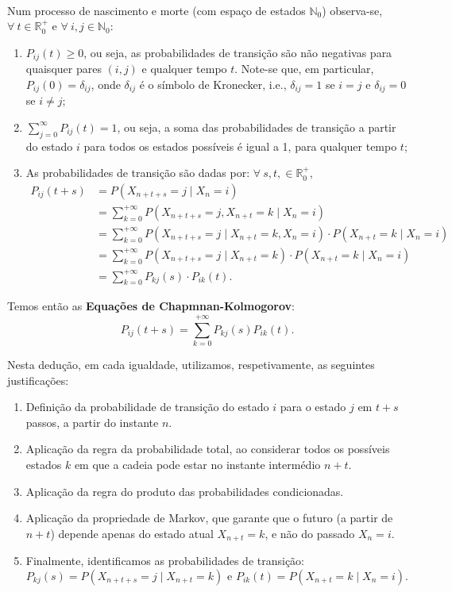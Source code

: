 \documentclass[
  11pt,
  a4paper,
]{book}
\theoremstyle{definition}
\theoremstyle{definition}
\theoremstyle{definition}
\theoremstyle{definition}
\theoremstyle{remark}
\begin{document}
\(\,\)

Num processo de nascimento e morte (com espaço de estados \(\mathbb{N}_0\)) observa-se, \(\forall ~t\in\mathbb{R}_0^+\) e \(\forall ~ i,j\in\mathbb{N}_0\):

\begin{enumerate}
\def\labelenumi{\arabic{enumi}.}
\item
  \(P_{ij}(t) \geq 0\), ou seja, as probabilidades de transição são não negativas para quaisquer pares \((i,j)\) e qualquer tempo \(t\). Note-se que, em particular, \(P_{ij}(0)=\delta_{ij}\), onde \(\delta_{ij}\) é o símbolo de Kronecker, i.e., \(\delta_{ij}=1\) se \(i=j\) e \(\delta_{ij}=0\) se \(i \neq j\);
\item
  \(\displaystyle \sum_{j=0}^{\infty} P_{ij}(t)=1\), ou seja, a soma das probabilidades de transição a partir do estado \(i\) para todos os estados possíveis é igual a 1, para qualquer tempo \(t\);
\item
  As probabilidades de transição são dadas por: \(\forall ~s,t, \in \mathbb{R}_0^+\),
  \begin{align*}
  P_{ij}(t+s) &= P(X_{n+t+s}=j \mid X_n=i)  \\
           &= \sum\limits_{k=0}^{+\infty} P(X_{n+t+s}=j, X_{n+t}=k \mid X_n=i) \\
           &= \sum\limits_{k=0}^{+\infty} P(X_{n+t+s}=j \mid X_{n+t}=k, X_n=i) \cdot P(X_{n+t}=k \mid X_n=i) \\
           &= \sum\limits_{k=0}^{+\infty} P(X_{n+t+s}=j \mid X_{n+t}=k) \cdot P(X_{n+t}=k \mid X_n=i) \\
           &= \sum\limits_{k=0}^{+\infty} P_{kj}(s) \cdot P_{ik}(t).
  \end{align*}
\end{enumerate}

Temos então as \textbf{Equações de Chapmnan-Kolmogorov}:
\begin{equation}
\label{eq:chapkol}
\boxed{P_{ij}(t+s)=\sum\limits_{k=0}^{+\infty} P_{kj}(s) P_{ik}(t).}
\end{equation}

Nesta dedução, em cada igualdade, utilizamos, respetivamente, as seguintes justificações:

\begin{enumerate}
\def\labelenumi{\arabic{enumi}.}
\item
  Definição da probabilidade de transição do estado \(i\) para o estado \(j\) em \(t+s\) passos, a partir do instante \(n\).
\item
  Aplicação da regra da probabilidade total, ao considerar todos os possíveis estados \(k\) em que a cadeia pode estar no instante intermédio \(n+t\).
\item
  Aplicação da regra do produto das probabilidades condicionadas.
\item
  Aplicação da propriedade de Markov, que garante que o futuro (a partir de \(n+t\)) depende apenas do estado atual \(X_{n+t}=k\), e não do passado \(X_n=i\).
\item
  Finalmente, identificamos as probabilidades de transição:
  \[P_{kj}(s) = P(X_{n+t+s}=j \mid X_{n+t}=k) \text{ e } P_{ik}(t) = P(X_{n+t}=k \mid X_n=i).\]
\end{enumerate}
\end{document}
